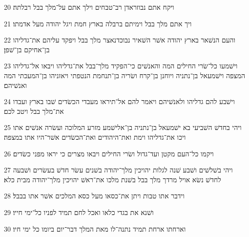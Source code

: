 \par 20 ויקח אתם נבוזראדן רב־טבחים וילך אתם על־מלך בבל רבלתה׃
\par 21 ויך אתם מלך בבל וימיתם ברבלה בארץ חמת ויגל יהודה מעל אדמתו׃
\par 22 והעם הנשׁאר בארץ יהודה אשׁר השׁאיר נבוכדנאצר מלך בבל ויפקד עליהם את־גדליהו בן־אחיקם בן־שׁפן׃
\par 23 וישׁמעו כל־שׂרי החילים המה והאנשׁים כי־הפקיד מלך־בבל את־גדליהו ויבאו אל־גדליהו המצפה וישׁמעאל בן־נתניה ויוחנן בן־קרח ושׂריה בן־תנחמת הנטפתי ויאזניהו בן־המעכתי המה ואנשׁיהם׃
\par 24 וישׁבע להם גדליהו ולאנשׁיהם ויאמר להם אל־תיראו מעבדי הכשׂדים שׁבו בארץ ועבדו את־מלך בבל ויטב לכם׃
\par 25 ויהי בחדשׁ השׁביעי בא ישׁמעאל בן־נתניה בן־אלישׁמע מזרע המלוכה ועשׂרה אנשׁים אתו ויכו את־גדליהו וימת ואת־היהודים ואת־הכשׂדים אשׁר־היו אתו במצפה׃
\par 26 ויקמו כל־העם מקטן ועד־גדול ושׂרי החילים ויבאו מצרים כי יראו מפני כשׂדים׃
\par 27 ויהי בשׁלשׁים ושׁבע שׁנה לגלות יהויכין מלך־יהודה בשׁנים עשׂר חדשׁ בעשׂרים ושׁבעה לחדשׁ נשׂא אויל מרדך מלך בבל בשׁנת מלכו את־ראשׁ יהויכין מלך־יהודה מבית כלא׃
\par 28 וידבר אתו טבות ויתן את־כסאו מעל כסא המלכים אשׁר אתו בבבל׃
\par 29 ושׁנא את בגדי כלאו ואכל לחם תמיד לפניו כל־ימי חייו׃
\par 30 וארחתו ארחת תמיד נתנה־לו מאת המלך דבר־יום ביומו כל ימי חיו׃


